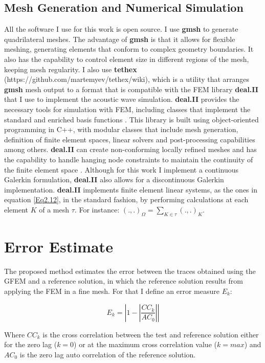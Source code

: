 \subsection{Mesh Generation and Numerical Simulation}
All the software I use for this work is open source. I use \textbf{gmsh} \cite{Geuzaine2009} to generate quadrilateral meshes. The advantage of \textbf{gmsh} is that it allows for flexible meshing, generating elements that conform to complex geometry boundaries. It also has the capability to control element size in different regions of the mesh, keeping mesh regularity. I also use \textbf{tethex} (https://github.com/martemyev/tethex/wiki), which is a utility that arranges \textbf{gmsh} mesh output to a format that is compatible with the FEM library \textbf{deal.II} \cite{Bangerth2007} that I use to implement the acoustic wave simulation. \textbf{deal.II}  provides the necessary tools  for simulation with FEM, including classes that implement the standard and enriched  basis functions \cite{Davydov2017}. This library is built using object-oriented programming in C++, with modular classes that include mesh generation, definition of finite element spaces, linear solvers and post-processing capabilities among others. \textbf{deal.II} can create non-conforming locally refined meshes and has the capability to handle hanging node constraints to maintain  the continuity of  the finite element space . Although for this work I implement a continuous Galerkin formulation, \textbf{deal.II} also allows for a discontinuous Galerkin implementation.
\textbf{deal.II} implements finite element linear systems, as the ones in equation \ref{Eq2.12}, in the standard fashion, by performing calculations at each element $K$ of a mesh $\tau$. For instance:  $(.,.)_\Omega= \displaystyle\sum_{K \in \tau} (.,.)_K$.

\section{Error Estimate}
The proposed method estimates the error between the traces obtained  using the GFEM and a reference solution, in which the reference solution results from applying the FEM in a fine mesh. For that I define an error measure $E_k$:

 \begin{equation} \label{Eq2.17}
  E_k =\left| 1 - \left|  \frac{ CC_k }{AC_0 }  \right| \right|
 \end{equation}

Where $CC_k$ is the cross correlation between the test and reference solution either for the zero lag ($k=0$) or at the maximum cross correlation value ($k=max$) and $AC_0$ is the zero lag auto correlation of the reference solution.

